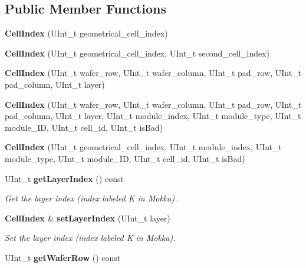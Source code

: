 \subsection*{Public Member Functions}
\begin{DoxyCompactItemize}
\item 
{\bfseries CellIndex} (UInt\_\-t geometrical\_\-cell\_\-index)\label{classCALICE_1_1CellIndex_a4cf7ff45b88a4e2b1062ae7caaa58806}

\item 
{\bfseries CellIndex} (UInt\_\-t geometrical\_\-cell\_\-index, UInt\_\-t second\_\-cell\_\-index)\label{classCALICE_1_1CellIndex_aba275ac1e16f6e6e08ff9b4e4dd61f17}

\item 
{\bfseries CellIndex} (UInt\_\-t wafer\_\-row, UInt\_\-t wafer\_\-column, UInt\_\-t pad\_\-row, UInt\_\-t pad\_\-column, UInt\_\-t layer)\label{classCALICE_1_1CellIndex_a5ab1c3185be6a529aaf2b4476945ac94}

\item 
{\bfseries CellIndex} (UInt\_\-t wafer\_\-row, UInt\_\-t wafer\_\-column, UInt\_\-t pad\_\-row, UInt\_\-t pad\_\-column, UInt\_\-t layer, UInt\_\-t module\_\-index, UInt\_\-t module\_\-type, UInt\_\-t module\_\-ID, UInt\_\-t cell\_\-id, UInt\_\-t isBad)\label{classCALICE_1_1CellIndex_a09201c4195f548a1ecbc740ab5178724}

\item 
{\bfseries CellIndex} (UInt\_\-t geometrical\_\-cell\_\-index, UInt\_\-t module\_\-index, UInt\_\-t module\_\-type, UInt\_\-t module\_\-ID, UInt\_\-t cell\_\-id, UInt\_\-t isBad)\label{classCALICE_1_1CellIndex_a5c849e4daa21098f71c02773466bc2f0}

\item 
UInt\_\-t {\bf getLayerIndex} () const \label{classCALICE_1_1CellIndex_a0467195bc639bda8edba4a9c96e7c0c3}

\begin{DoxyCompactList}\small\item\em Get the layer index (index labeled K in Mokka). \item\end{DoxyCompactList}\item 
{\bf CellIndex} \& {\bf setLayerIndex} (UInt\_\-t layer)\label{classCALICE_1_1CellIndex_a1138c5745d65ec60aa71938eb87bc842}

\begin{DoxyCompactList}\small\item\em Set the layer index (index labeled K in Mokka). \item\end{DoxyCompactList}\item 
UInt\_\-t {\bf getWaferRow} () const \label{classCALICE_1_1CellIndex_a760bda3a8354e9d93d9332220aa7c97d}


\end{DoxyCompactItemize}
